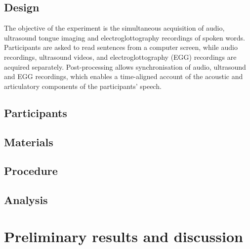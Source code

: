 \documentclass[a4paper]{article}\usepackage[]{graphicx}\usepackage[]{color}
\begin{document}
\subsection{Design}
The objective of the experiment is the simultaneous acquisition of audio, ultrasound tongue imaging and electroglottography recordings of spoken words.
Participants are asked to read sentences from a computer screen, while audio recordings, ultrasound videos, and electroglottography (EGG) recordings are acquired separately.
Post-processing allows synchronisation of audio, ultrasound and EGG recordings, which enables a time-aligned account of the acoustic and articulatory components of the participants' speech.

\subsection{Participants}

\subsection{Materials}

\subsection{Procedure}



\subsection{Analysis}


\section{Preliminary results and discussion}





\end{document}
